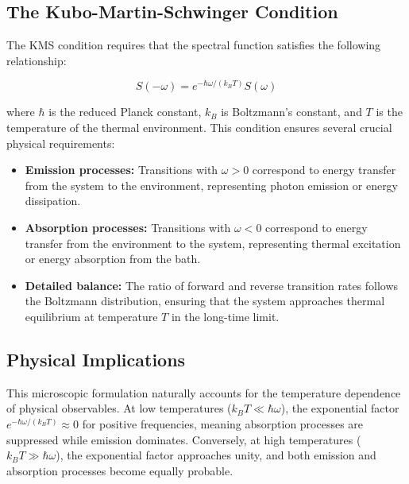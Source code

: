 \subsection{The Kubo-Martin-Schwinger Condition}
\label{subsec:kms_condition}

\noindent The KMS condition requires that the spectral function satisfies the following relationship:

\begin{equation}
    S(-\omega) = e^{-\hbar\omega/(k_B T)} S(\omega)
    \label{eq:kms_condition}
\end{equation}

\noindent where $\hbar$ is the reduced Planck constant, $k_B$ is Boltzmann's constant, and $T$ is the temperature of the thermal environment. This condition ensures several crucial physical requirements:

\begin{itemize}
    \item \textbf{Emission processes:} Transitions with $\omega > 0$ correspond to energy transfer from the system to the environment, representing photon emission or energy dissipation.

    \item \textbf{Absorption processes:} Transitions with $\omega < 0$ correspond to energy transfer from the environment to the system, representing thermal excitation or energy absorption from the bath.

    \item \textbf{Detailed balance:} The ratio of forward and reverse transition rates follows the Boltzmann distribution, ensuring that the system approaches thermal equilibrium at temperature $T$ in the long-time limit.
\end{itemize}

\subsection{Physical Implications}
\label{subsec:physical_implications}

\noindent This microscopic formulation naturally accounts for the temperature dependence of physical observables. At low temperatures ($k_B T \ll \hbar\omega$), the exponential factor $e^{-\hbar\omega/(k_B T)} \approx 0$ for positive frequencies, meaning absorption processes are suppressed while emission dominates. Conversely, at high temperatures ($k_B T \gg \hbar\omega$), the exponential factor approaches unity, and both emission and absorption processes become equally probable.

